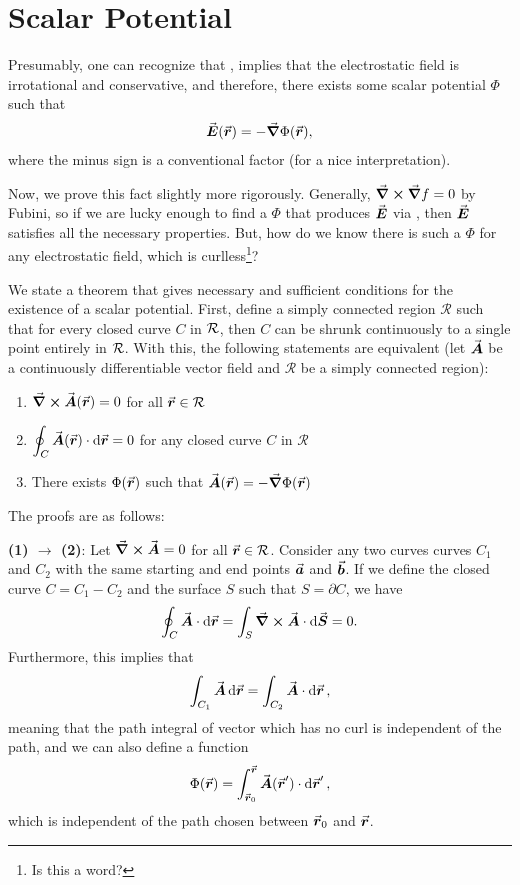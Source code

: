 \chapter{Scalar Potential}

Presumably, one can recognize that , implies that the electrostatic field is irrotational and conservative, and therefore, there exists some scalar potential $\Phi$ such that
\begin{eqnarray}
    \label{eq:scalar-potential}
    \va*{E}(\va*{r}) = - \grad \Phi(\va*{r})
,\end{eqnarray}
where the minus sign is a conventional factor (for a nice interpretation).

Now, we prove this fact slightly more rigorously.
Generally, $\curl{\grad f} = 0$ by Fubini, so if we are lucky enough to find a $\Phi$ that produces $\va*{E}$ via , then $\va*{E}$ satisfies all the necessary properties.
But, how do we know there is such a $\Phi$ for any electrostatic field, which is curlless\footnote{Is this a word?}?

We state a theorem that gives necessary and sufficient conditions for the existence of a scalar potential.
First, define a simply connected region $\mathcal{R}$ such that for every closed curve $C$ in $\cal R$, then $C$ can be shrunk continuously to a single point entirely in $\cal R$.
With this, the following statements are equivalent (let $\va*{A}$ be a continuously differentiable vector field and $\mathcal{R}$ be a simply connected region):
\begin{enumerate}
    \item $\curl{\va*{A}(\va*{r})} = 0$ for all $\va*{r} \in \mathcal{R}$
    \item $\displaystyle \oint_{C} \va*{A}(\va*{r}) \cdot \dd{\va*{r}} = 0$ for any closed curve $C$ in $\mathcal{R}$
    \item There exists $\Phi(\va*{r})$ such that $\va*{A}(\va*{r}) = -\grad \Phi(\va*{r})$
\end{enumerate}

The proofs are as follows:

\textbf{(1) $\rightarrow$ (2)}: Let $\curl{\va*{A}} = 0$ for all $\va*{r} \in \mathcal{R}$.
Consider any two curves curves $C_1$ and $C_2$ with the same starting and end points $\va*{a}$ and $\va*{b}$.
If we define the closed curve $C = C_1 - C_2$ and the surface $S$ such that $S = \partial C$, we have
\begin{eqnarray}
    \oint_{C} \va*{A} \cdot \dd{\va*{r}} = \int_{S} \curl{\va*{A}} \cdot \dd{\va*{S}} = 0
.\end{eqnarray}
Furthermore, this implies that
\begin{eqnarray}
    \int_{C_1} \va*{A} \dd{\va*{r}} = \int_{C_2} \va*{A} \cdot \dd{\va*{r}}
,\end{eqnarray}
meaning that the path integral of vector which has no curl is independent of the path, and we can also define a function
\begin{eqnarray}
    \label{eq:scalar-potential-def}
    \Phi(\va*{r}) = \int_{\va*{r}_{0}}^{\va*{r}} \va*{A}(\va*{r}') \cdot \dd{\va*{r}'}
,\end{eqnarray}
which is independent of the path chosen between $\va*{r}_0$ and $\va*{r}$.

